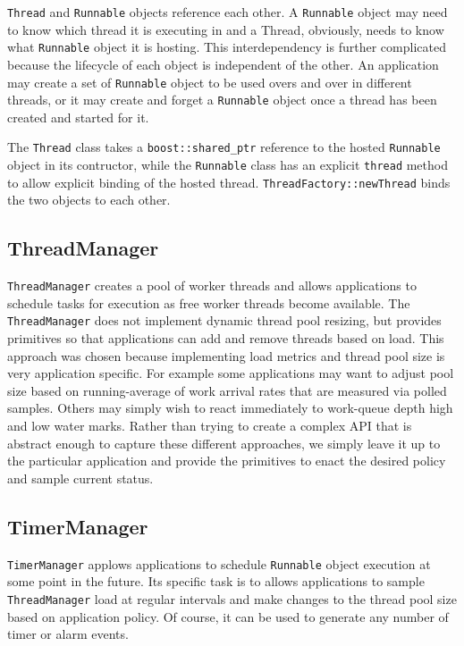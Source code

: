 \documentclass[nocopyrightspace,blockstyle]{sigplanconf}
\begin{document}
\texttt{Thread} and \texttt{Runnable} objects reference each other. A \texttt{Runnable}
object may need to know which thread it is executing in and a Thread, obviously,
needs to know what \texttt{Runnable} object it is hosting. This interdependency is
further complicated because the lifecycle of each object is independent of the
other. An application may create a set of \texttt{Runnable} object to be used overs
and over in different threads, or it may create and forget a \texttt{Runnable} object
once a thread has been created and started for it. 

The \texttt{Thread} class takes a \texttt{boost::shared\_ptr} reference to the hosted
\texttt{Runnable} object in its contructor, while the \texttt{Runnable} class has an
explicit \texttt{thread} method to allow explicit binding of the hosted thread.
\texttt{ThreadFactory::newThread} binds the two objects to each other.

\subsection{ThreadManager}

\texttt{ThreadManager} creates a pool of worker threads and 
allows applications to schedule tasks for execution as free worker threads
become available. The \texttt{ThreadManager} does not implement dynamic 
thread pool resizing, but provides primitives so that applications can add
and remove threads based on load. This approach was chosen because 
implementing load metrics and thread pool size is very application 
specific. For example some applications may want to adjust pool size based
on running-average of work arrival rates that are measured via polled
samples. Others may simply wish to react immediately to work-queue
depth high and low water marks. Rather than trying to create a complex
API that is abstract enough to capture these different approaches, we 
simply leave it up to the particular application and provide the 
primitives to enact the desired policy and sample current status.

\subsection{TimerManager}

\texttt{TimerManager} applows applications to schedule
 \texttt{Runnable} object execution at some point in the future. Its specific task 
is to allows applications to sample \texttt{ThreadManager} load at regular
intervals and make changes to the thread pool size based on application policy.
Of course, it can be used to generate any number of timer or alarm events.
\end{document}
